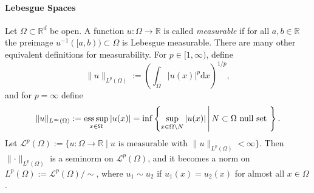 \paragraph{Lebesgue Spaces}
Let $\Omega\subset\mathbb{R}^d$ be open. A function $u:\Omega\longrightarrow\mathbb{R}$ is called \textit{measurable} if for all $a,b\in\mathbb{R}$ the preimage $u^{-1}([a,b))\subset\Omega$ is Lebesgue measurable. There are many other equivalent definitions for measurability. For $p\in[1,\infty)$, define
\[\lVert u\rVert_{L^p(\Omega)}:=\left(\int_\Omega{\lvert u(x)\rvert^p\mathrm{d}x}\right)^{1/p},\]
and for $p=\infty$ define
\[\lVert u\rVert_{L^\infty(\Omega)}:=\operatorname*{ess\,sup}_{x\in\Omega}{\lvert u(x)\rvert}=\inf\left\{\sup_{x\in\Omega\setminus N}{\lvert u(x)\rvert}\,\middle\vert\,N\subset\Omega\text{ null set }\right\}.\]
Let $\mathcal{L}^p(\Omega):=\{u:\Omega\longrightarrow\mathbb{R}\mid u\text{ is measurable with }\lVert u\rVert_{L^p(\Omega)}<\infty\}$. Then $\lVert\cdot\rVert_{L^p(\Omega)}$ is a seminorm on $\mathcal{L}^p(\Omega)$, and it becomes a norm on $L^p(\Omega):=\mathcal{L}^p(\Omega)/\sim$, where $u_1\sim u_2$ if $u_1(x)=u_2(x)$ for almost all $x\in\Omega$.\\

